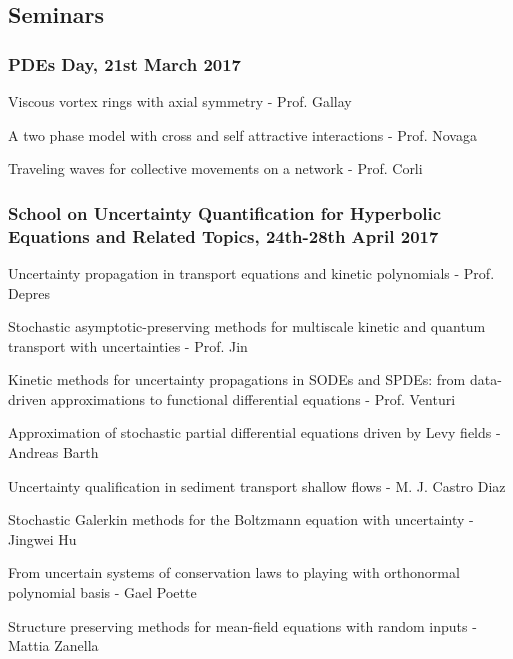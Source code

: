 \documentclass{article}
\begin{document}
\subsection{Seminars}

\subsubsection{PDEs Day, 21st March 2017}

\begin{outline}[enumerate]

\1 Viscous vortex rings with axial symmetry - Prof. Gallay

\1A two phase model with cross and self attractive interactions - Prof. Novaga

\1 Traveling waves for collective movements on a network - Prof. Corli

\end{outline}

\subsubsection{School on Uncertainty Quantification for Hyperbolic Equations and Related Topics, 24th-28th April 2017}

\begin{outline}[enumerate]

\1 Uncertainty propagation in transport equations and kinetic polynomials - Prof. Depres

\1 Stochastic asymptotic-preserving methods for multiscale kinetic and quantum transport with uncertainties - Prof. Jin

\1 Kinetic methods for uncertainty propagations in SODEs and SPDEs: from data-driven approximations to functional differential equations - Prof. Venturi

\1 Approximation of stochastic partial differential equations driven by Levy fields - Andreas Barth

\1 Uncertainty qualification in sediment transport shallow flows - M. J. Castro Diaz

\1 Stochastic Galerkin methods for the Boltzmann equation with uncertainty - Jingwei Hu

\1 From uncertain systems of conservation laws to playing with orthonormal polynomial basis - Gael Poette

\1 Structure preserving methods for mean-field equations with random inputs - Mattia Zanella

\end{outline}
\end{document}
